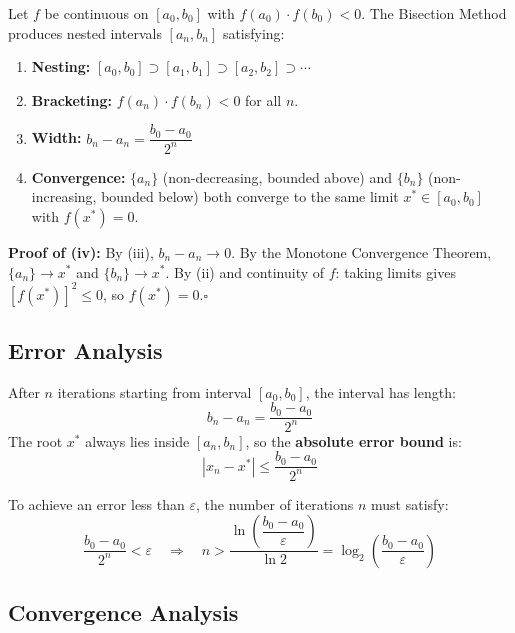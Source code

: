 \documentclass[12pt]{article}
\begin{document}
\bigskip

\begin{thmbox}
Let $f$ be continuous on $[a_0,b_0]$ with $f(a_0)\cdot f(b_0)<0$. The Bisection Method produces nested intervals $[a_n,b_n]$ satisfying:
\begin{enumerate}[noitemsep]
  \item \textbf{Nesting:} $[a_0,b_0]\supset[a_1,b_1]\supset[a_2,b_2]\supset\cdots$
  \item \textbf{Bracketing:} $f(a_n)\cdot f(b_n)<0$ for all $n$.
  \item \textbf{Width:} $b_n-a_n = \dfrac{b_0-a_0}{2^n}$
  \item \textbf{Convergence:} $\{a_n\}$ (non-decreasing, bounded above) and $\{b_n\}$ (non-increasing, bounded below) both converge to the same limit $x^*\in[a_0,b_0]$ with $f(x^*)=0$.
\end{enumerate}
\textbf{Proof of (iv):} By (iii), $b_n-a_n\to 0$. By the Monotone Convergence Theorem, $\{a_n\}\to x^*$ and $\{b_n\}\to x^*$. By (ii) and continuity of $f$: taking limits gives $[f(x^*)]^2\leq 0$, so $f(x^*)=0$.\hfill$\square$
\end{thmbox}

\bigskip

\subsection*{Error Analysis}

After $n$ iterations starting from interval $[a_0, b_0]$, the interval has length:
\[
  b_n - a_n = \frac{b_0 - a_0}{2^n}
\]
The root $x^*$ always lies inside $[a_n, b_n]$, so the \textbf{absolute error bound} is:
\[
  \boxed{|x_n - x^*| \leq \frac{b_0 - a_0}{2^n}}
\]

\begin{thmbox}
To achieve an error less than $\varepsilon$, the number of iterations $n$ must satisfy:
\[
  \frac{b_0 - a_0}{2^n} < \varepsilon
  \quad\Longrightarrow\quad
  n > \frac{\ln\!\left(\dfrac{b_0 - a_0}{\varepsilon}\right)}{\ln 2}
  = \log_2\!\left(\frac{b_0 - a_0}{\varepsilon}\right)
\]
\end{thmbox}

\bigskip

\subsection*{Convergence Analysis}
\end{document}
